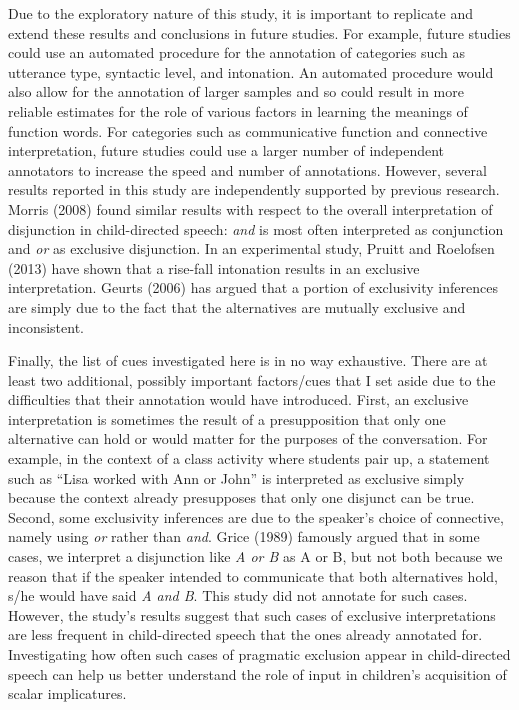 \documentclass[floatsintext,man]{apa6}
\theoremstyle{definition}
\theoremstyle{definition}
\theoremstyle{definition}
\theoremstyle{remark}
\begin{document}
Due to the exploratory nature of this study, it is important to
replicate and extend these results and conclusions in future studies.
For example, future studies could use an automated procedure for the
annotation of categories such as utterance type, syntactic level, and
intonation. An automated procedure would also allow for the annotation
of larger samples and so could result in more reliable estimates for the
role of various factors in learning the meanings of function words. For
categories such as communicative function and connective interpretation,
future studies could use a larger number of independent annotators to
increase the speed and number of annotations. However, several results
reported in this study are independently supported by previous research.
Morris (2008) found similar results with respect to the overall
interpretation of disjunction in child-directed speech: \emph{and} is
most often interpreted as conjunction and \emph{or} as exclusive
disjunction. In an experimental study, Pruitt and Roelofsen (2013) have
shown that a rise-fall intonation results in an exclusive
interpretation. Geurts (2006) has argued that a portion of exclusivity
inferences are simply due to the fact that the alternatives are mutually
exclusive and inconsistent.

Finally, the list of cues investigated here is in no way exhaustive.
There are at least two additional, possibly important factors/cues that
I set aside due to the difficulties that their annotation would have
introduced. First, an exclusive interpretation is sometimes the result
of a presupposition that only one alternative can hold or would matter
for the purposes of the conversation. For example, in the context of a
class activity where students pair up, a statement such as \enquote{Lisa
worked with Ann or John} is interpreted as exclusive simply because the
context already presupposes that only one disjunct can be true. Second,
some exclusivity inferences are due to the speaker's choice of
connective, namely using \emph{or} rather than \emph{and}. Grice (1989)
famously argued that in some cases, we interpret a disjunction like
\emph{A or B} as A or B, but not both because we reason that if the
speaker intended to communicate that both alternatives hold, s/he would
have said \emph{A and B}. This study did not annotate for such cases.
However, the study's results suggest that such cases of exclusive
interpretations are less frequent in child-directed speech that the ones
already annotated for. Investigating how often such cases of pragmatic
exclusion appear in child-directed speech can help us better understand
the role of input in children's acquisition of scalar implicatures.
\end{document}
